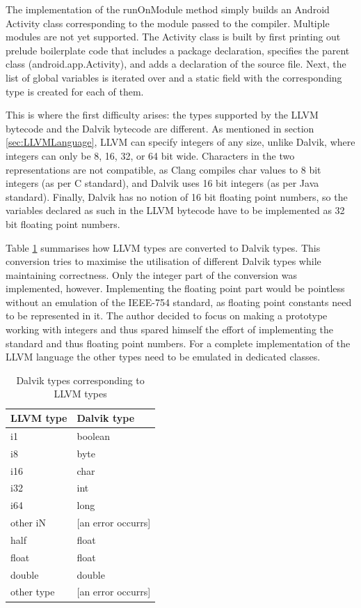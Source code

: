 \documentclass[parskip]{cs4rep}
\begin{document}
The implementation of the runOnModule method simply builds an Android Activity class corresponding to the module passed to the compiler. Multiple modules are not yet supported. The Activity class is built by first printing out prelude boilerplate code that includes a package declaration, specifies the parent class (android.app.Activity), and adds a declaration of the source file. Next, the list of global variables is iterated over and a static field with the corresponding type is created for each of them. 

This is where the first difficulty arises: the types supported by the LLVM bytecode and the Dalvik bytecode are different. As mentioned in section \ref{sec:LLVMLanguage}, LLVM can specify integers of any size, unlike Dalvik, where integers can only be 8, 16, 32, or 64 bit wide. Characters in the two representations are not compatible, as Clang compiles char values to 8 bit integers (as per C standard), and Dalvik uses 16 bit integers (as per Java standard). Finally, Dalvik has no notion of 16 bit floating point numbers, so the variables declared as such in the LLVM bytecode have to be implemented as 32 bit floating point numbers.

Table \ref{tab:typeConversion} summarises how LLVM types are converted to Dalvik types. This conversion tries to maximise the utilisation of different Dalvik types while maintaining correctness. Only the integer part of the conversion was implemented, however. Implementing the floating point part would be pointless without an emulation of the IEEE-754 standard, as floating point constants need to be represented in it. The author decided to focus on making a prototype working with integers and thus spared himself the effort of implementing the standard and thus floating point numbers. For a complete implementation of the LLVM language the other types need to be emulated in dedicated classes.

\begin{table}[htb]
    \centering
    \begin{tabular}{ | l | l |}
    \hline
    LLVM type & Dalvik type \\ \hline \hline
    i1 & boolean \\ \hline
    i8 & byte \\ \hline
    i16 & char \\ \hline
    i32 & int \\ \hline
    i64 & long \\ \hline
    other iN & [an error occurrs] \\ \hline
    half & float \\ \hline
    float & float \\ \hline
    double & double \\ \hline
    other type & [an error occurrs] \\ \hline
    \end{tabular}
    \caption{Dalvik types corresponding to LLVM types}
    \label{tab:typeConversion}
\end{table}
\end{document}
